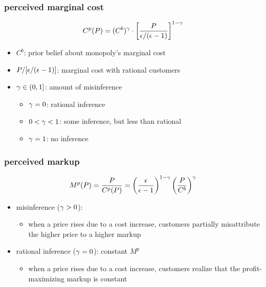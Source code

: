 \documentclass[12pt,xcolor={dvipsnames},hyperref={pdftex,pdfpagemode=UseNone,hidelinks,pdfdisplaydoctitle=true},usepdftitle=false]{beamer}
\begin{document}
\begin{frame}
\frametitle{perceived marginal cost}
\begin{equation*}
C^{p}(P)= (C^b)^{\gamma} \cdot \left[ \frac{P}{\epsilon/(\epsilon-1)} \right]^{1-\gamma}
\end{equation*}
\begin{itemize}
\item $C^b$: prior belief about monopoly's marginal cost
\item $P/[\epsilon/(\epsilon-1)]$: marginal cost with rational customers
\item $\gamma\in (0,1]$: amount of misinference
\begin{itemize}
\item $\gamma = 0$: rational inference
\item $0 < \gamma < 1$: some inference, but less than rational
\item $\gamma = 1$: no inference
\end{itemize}
\end{itemize}
\end{frame}

\begin{frame}
\frametitle{perceived markup}
\begin{equation*}
M^p(P) = \frac{P}{C^{p}(P)} = \left( \frac{\epsilon}{\epsilon-1} \right)^{1-\gamma}  \left( \frac{P}{C^b} \right)^{\gamma}
\end{equation*}
\begin{itemize}
\item misinference ($\gamma>0$): 
\begin{itemize}
\item when a price rises due to a cost increase, customers partially misattribute the higher price to a higher markup
\end{itemize}
\item rational inference ($\gamma = 0$): constant $M^p$
\begin{itemize}
\item when a price rises due to a cost increase, customers realize that the profit-maximizing markup is constant
\end{itemize}
\end{itemize}
\end{frame}
\end{document}
